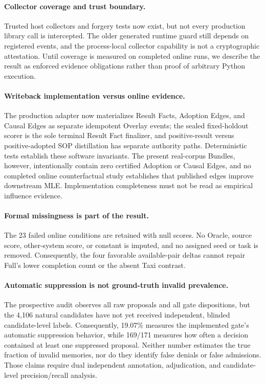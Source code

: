 \documentclass{article}
\begin{document}
\paragraph{Collector coverage and trust boundary.}
Trusted host collectors and forgery tests now exist, but not every production
library call is intercepted.  The older generated runtime guard still depends
on registered events, and the process-local collector capability is not a
cryptographic attestation.  Until coverage is measured on completed online runs,
we describe the result as enforced evidence obligations rather than proof of
arbitrary Python execution.

\paragraph{Writeback implementation versus online evidence.}
The production adapter now materializes Result Facts, Adoption Edges, and Causal
Edges as separate idempotent Overlay events; the sealed fixed-holdout scorer is
the sole terminal Result Fact finalizer, and positive-result versus
positive-adopted SOP distillation has separate authority paths.  Deterministic
tests establish these software invariants.  The present real-corpus Bundles,
however, intentionally contain zero certified Adoption or Causal Edges, and no
completed online counterfactual study establishes that published edges improve
downstream MLE.  Implementation completeness must not be read as empirical
influence evidence.

\paragraph{Formal missingness is part of the result.}
The 23 failed online conditions are retained with null scores.  No Oracle,
source score, other-system score, or constant is imputed, and no assigned seed or
task is removed.  Consequently, the four favorable available-pair deltas cannot
repair Full's lower completion count or the absent Taxi contrast.

\paragraph{Automatic suppression is not ground-truth invalid prevalence.}
The prospective audit observes all raw proposals and all gate dispositions, but
the 4,106 natural candidates have not yet received independent, blinded
candidate-level labels.  Consequently, 19.07\% measures the implemented gate's
automatic suppression behavior, while 169/171 measures how often a decision
contained at least one suppressed proposal.  Neither number estimates the true
fraction of invalid memories, nor do they identify false denials or false
admissions.  Those claims require dual independent annotation, adjudication,
and candidate-level precision/recall analysis.
\end{document}
